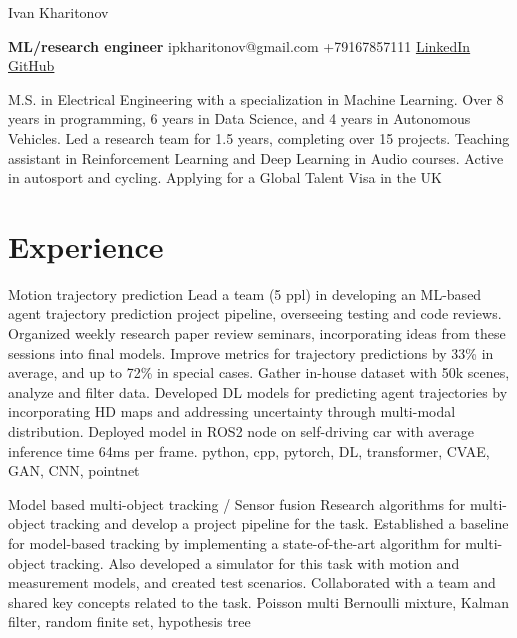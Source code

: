 \documentclass[]{resume}
\begin{document}
\begin{center}
	\Huge Ivan Kharitonov \par
	\normalsize  \textbf{ML/research engineer} \hfill ipkharitonov@gmail.com \hfill +79167857111 \hfill \href{https://www.linkedin.com/in/ivan-kharitonov-main/}{LinkedIn} \hfill \href{https://github.com/kharitonov-ivan}{GitHub}
\end{center}
\vspace{-1em}

\noindent M.S. in Electrical Engineering with a specialization in Machine Learning. Over 8 years in programming, 6 years in Data Science, and 4 years in Autonomous Vehicles. Led a research team for 1.5 years, completing over 15 projects. Teaching assistant in Reinforcement Learning and Deep Learning in Audio courses. Active in autosport and cycling. Applying for a Global Talent Visa in the UK

\section*{\sectionformat Experience}
\project
{Motion trajectory prediction}
{Lead a team (5 ppl) in developing an ML-based agent trajectory prediction project pipeline, overseeing testing and code reviews. Organized weekly research paper review seminars, incorporating ideas from these sessions into final models.}
{Improve metrics for trajectory predictions by 33\% in average, and up to 72\% in special cases. Gather in-house dataset with 50k scenes, analyze and filter data. Developed DL models for predicting agent trajectories by incorporating HD maps and addressing uncertainty through multi-modal distribution. Deployed model in ROS2 node on self-driving car with average inference time 64ms per frame.}
{python, cpp, pytorch, DL, transformer, CVAE, GAN, CNN, pointnet}

\project
{Model based multi-object tracking / Sensor fusion}
{Research algorithms for multi-object tracking and develop a project pipeline for the task.}
{Established a baseline for model-based tracking by implementing a state-of-the-art algorithm for multi-object tracking. Also developed a simulator for this task with motion and measurement models, and created test scenarios. Collaborated with a team and shared key concepts related to the task.}
{Poisson multi Bernoulli mixture, Kalman filter, random finite set, hypothesis tree}
\end{document}
